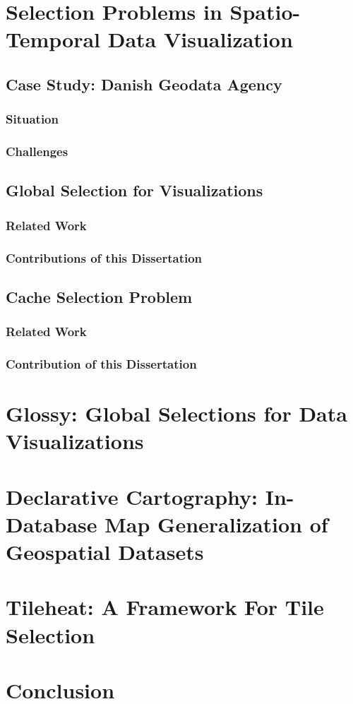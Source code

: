 \documentclass[11pt, oneside]{report}   	%
\begin{document}
\chapter{Selection Problems in Spatio-Temporal Data Visualization}
\section{Case Study: Danish Geodata Agency}
\subsection{Situation}
\subsection{Challenges}
\section{Global Selection for Visualizations}
\subsection{Related Work}
\subsection{Contributions of this Dissertation}
\section{Cache Selection Problem}
\subsection{Related Work}
\subsection{Contribution of this Dissertation}

\chapter{Glossy: Global Selections for Data Visualizations}
\chapter{Declarative Cartography: In-Database Map Generalization of Geospatial Datasets}
\chapter{Tileheat: A Framework For Tile Selection}
\chapter{Conclusion}



\end{document}
